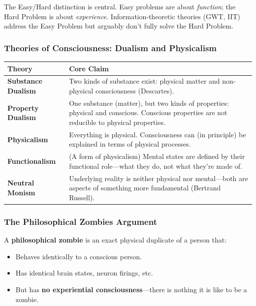 \begin{tipbox}
The Easy/Hard distinction is central. Easy problems are about \textit{function}; the Hard Problem is about \textit{experience}. Information-theoretic theories (GWT, IIT) address the Easy Problem but arguably don't fully solve the Hard Problem.
\end{tipbox}

\bigseparator

\subsubsection{Theories of Consciousness: Dualism and Physicalism}

\begin{center}
\renewcommand{\arraystretch}{1.4}
\begin{tabular}{@{} l p{9cm} @{}}
\toprule
\textbf{Theory} & \textbf{Core Claim} \\
\midrule
\textbf{Substance Dualism} & Two kinds of substance exist: physical matter and non-physical consciousness (Descartes). \\
\textbf{Property Dualism} & One substance (matter), but two kinds of properties: physical and conscious. Conscious properties are not reducible to physical properties. \\
\textbf{Physicalism} & Everything is physical. Consciousness can (in principle) be explained in terms of physical processes. \\
\textbf{Functionalism} & (A form of physicalism) Mental states are defined by their functional role---what they do, not what they're made of. \\
\textbf{Neutral Monism} & Underlying reality is neither physical nor mental---both are aspects of something more fundamental (Bertrand Russell). \\
\bottomrule
\end{tabular}
\end{center}

\bigseparator

\subsubsection{The Philosophical Zombies Argument}

\begin{defbox}
A \textbf{philosophical zombie} is an exact physical duplicate of a person that:
\begin{itemize}
  \item Behaves identically to a conscious person.
  \item Has identical brain states, neuron firings, etc.
  \item But has \textbf{no experiential consciousness}---there is nothing it is like to be a zombie.
\end{itemize}
\end{defbox}

